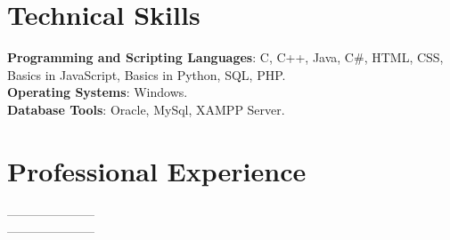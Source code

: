 \documentclass[margin,line]{res}
\newenvironment{list2}{
  \begin{list}{$\bullet$}{%
      \setlength{\itemsep}{0in}
      \setlength{\parsep}{0in} \setlength{\parskip}{0in}
      \setlength{\topsep}{0in} \setlength{\partopsep}{0in}
      \setlength{\leftmargin}{0.2in}}}{\end{list}}
\begin{document}
\begin{resume}
\section{\sc Technical Skills}
{\bf Programming and Scripting Languages}:  C, C++, Java, C\#, HTML, CSS, Basics in JavaScript,  Basics in Python, SQL, PHP.\\
{\bf Operating Systems}: Windows.\\
\iffalse
{\bf Tools}: Intel VTunes, GDB, Valgrind, Latex, Subversion, Crystal Reports, Informatica, Business Objects, IBM WebSphere Studio, MicroStrategy, Rational Rose Suite, Macromedia Dreamweaver, Adobe Photoshop \\
\fi
{\bf Database Tools}: Oracle, MySql, XAMPP Server. 
\section{\sc Professional Experience}
---------------------\\
---------------------

\iffalse
{\bf Institution}, City, State. Country. \hfill{August 2008 -- Present}\\
{\em First Job Name}\hfill {Summer 2011, June 2011 -- July 2011}\\
\begin{list2} %
\item Responsible for XYZ \\
\item Responsible for ABC\\
\end{list2}
{\em Second Job Name}\hfill {August 2009 -- January 2010}\\
\begin{list2} %
\item Responsible for XYZ \\
\item Responsible for ABC\\
\end{list2}
{\bf Institution 2}, City, State. Country. \hfill{August 2008 -- Present}\\
{\em First Job Name}\hfill {Summer 2011, June 2011 -- July 2011}\\
\begin{list2} %
\item Responsible for XYZ \\
\item Responsible for ABC\\
\end{list2}
{\em Second Job Name}\hfill {August 2009 -- January 2010}\\
\begin{list2} %
\item Responsible for XYZ \\
\item Responsible for ABC\\
\end{list2}
\fi

\end{resume}
\end{document}
